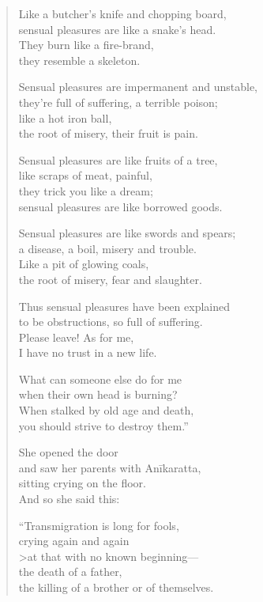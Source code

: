\documentclass[12pt,openany]{book}%
\begin{document}
\begin{verse}
Like a butcher’s knife and chopping board, \\
sensual pleasures are like a snake’s head. \\
They burn like a fire-brand, \\
they resemble a skeleton. 

Sensual pleasures are impermanent and unstable, \\
they’re full of suffering, a terrible poison; \\
like a hot iron ball, \\
the root of misery, their fruit is pain. 

Sensual pleasures are like fruits of a tree, \\
like scraps of meat, painful, \\
they trick you like a dream; \\
sensual pleasures are like borrowed goods. 

Sensual pleasures are like swords and spears; \\
a disease, a boil, misery and trouble. \\
Like a pit of glowing coals, \\
the root of misery, fear and slaughter. 

Thus sensual pleasures have been explained \\
to be obstructions, so full of suffering. \\
Please leave! As for me, \\
I have no trust in a new life. 

What can someone else do for me \\
when their own head is burning? \\
When stalked by old age and death, \\
you should strive to destroy them.” 

She opened the door \\
and saw her parents with \textsanskrit{Anīkaratta}, \\
sitting crying on the floor. \\
And so she said this: 

“Transmigration is long for fools, \\
crying again and again \\>at that with no known beginning—\\
the death of a father, \\
the killing of a brother or of themselves. 


\end{verse}
\end{document}
